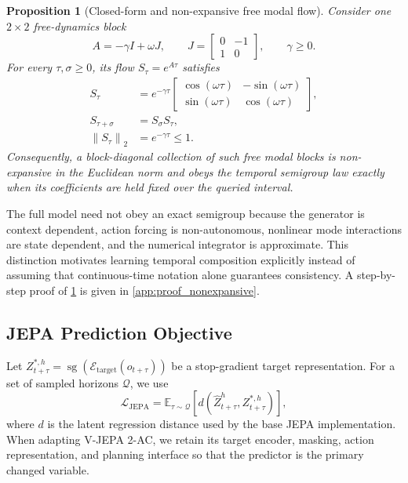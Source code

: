 \documentclass{article}
\theoremstyle{plain}
\newtheorem{proposition}[theorem]{Proposition}
\theoremstyle{definition}
\theoremstyle{remark}
\newcommand{\Enc}{\mathcal{E}}
\newcommand{\Loss}{\mathcal{L}}
\newcommand{\sg}{\operatorname{sg}}
\newcommand{\norm}[1]{\left\lVert #1 \right\rVert}
\begin{document}
\begin{proposition}[Closed-form and non-expansive free modal flow]
\label{prop:nonexpansive}
Consider one $2\times2$ free-dynamics block
\begin{equation}
A=-\gamma I+\omega J,
\qquad
J=
\begin{bmatrix}
0&-1\\
1&0
\end{bmatrix},
\qquad \gamma\ge0.
\end{equation}
For every $\tau,\sigma\ge0$, its flow $S_{\tau}=e^{A\tau}$ satisfies
\begin{align}
S_{\tau}
&=e^{-\gamma\tau}
\begin{bmatrix}
\cos(\omega\tau)&-\sin(\omega\tau)\\
\sin(\omega\tau)&\cos(\omega\tau)
\end{bmatrix},
\label{eq:closed_form_flow}
\\
S_{\tau+\sigma}&=S_{\sigma}S_{\tau},
\label{eq:free_semigroup}
\\
\norm{S_{\tau}}_2&=e^{-\gamma\tau}\le1.
\label{eq:free_nonexpansive}
\end{align}
Consequently, a block-diagonal collection of such free modal blocks is non-expansive in the Euclidean norm and obeys the temporal semigroup law exactly when its coefficients are held fixed over the queried interval.
\end{proposition}

The full model need not obey an exact semigroup because the generator is context dependent, action forcing is non-autonomous, nonlinear mode interactions are state dependent, and the numerical integrator is approximate. This distinction motivates learning temporal composition explicitly instead of assuming that continuous-time notation alone guarantees consistency. A step-by-step proof of \cref{prop:nonexpansive} is given in \cref{app:proof_nonexpansive}.

\subsection{JEPA Prediction Objective}
Let $Z^{*,h}_{t+\tau}=\sg(\Enc_{\mathrm{target}}(o_{t+\tau}))$ be a stop-gradient target representation. For a set of sampled horizons $\mathcal{Q}$, we use
\begin{equation}
    \Loss_{\mathrm{JEPA}}
    =
    \mathbb{E}_{\tau\sim\mathcal{Q}}
    \left[
    d\!\left(
        \widehat{Z}^{h}_{t+\tau},
        Z^{*,h}_{t+\tau}
    \right)
    \right],
    \label{eq:ljepa}
\end{equation}
where $d$ is the latent regression distance used by the base JEPA implementation. When adapting V-JEPA 2-AC, we retain its target encoder, masking, action representation, and planning interface so that the predictor is the primary changed variable.
\end{document}
